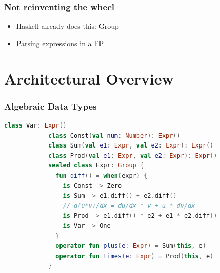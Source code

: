 \documentclass{beamer}
\begin{document}




    \begin{frame}
        \frametitle{Not reinventing the wheel}
        \begin{itemize}
            \item Haskell already does this: Group
            \item Parsing expressions in a FP
        \end{itemize}
    \end{frame}


    \section{Architectural Overview}\label{sec:third-section}

    \begin{frame}[fragile]
        \frametitle{Algebraic Data Types}
        \begin{lstlisting}[language=Kotlin, gobble=12]
            class Var: Expr()
            class Const(val num: Number): Expr()
            class Sum(val e1: Expr, val e2: Expr): Expr()
            class Prod(val e1: Expr, val e2: Expr): Expr()
            sealed class Expr: Group {
              fun diff() = when(expr) {
                is Const -> Zero
                is Sum -> e1.diff() + e2.diff()
                // d(u*v)/dx = du/dx * v + u * dv/dx
                is Prod -> e1.diff() * e2 + e1 * e2.diff()
                is Var -> One
              }
              operator fun plus(e: Expr) = Sum(this, e)
              operator fun times(e: Expr) = Prod(this, e)
            }
        \end{lstlisting}
    \end{frame}
\end{document}
